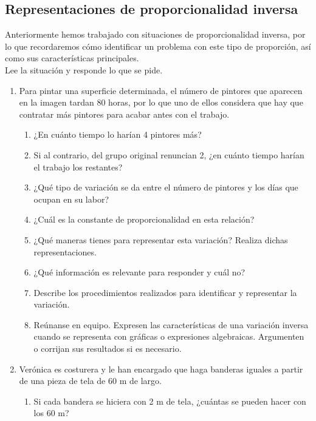 \documentclass[11pt]{book}
\begin{document}
\subsection{Representaciones de proporcionalidad inversa}
Anteriormente hemos trabajado con situaciones de proporcionalidad inversa, por lo que recordaremos cómo identificar
un problema con este tipo de proporción, así como sus características principales.\\

Lee la situación y responde lo que se pide.\\

\begin{enumerate}
  \item Para pintar una superficie determinada, el número de pintores que aparecen en la imagen tardan 80 horas,
        por lo que uno de ellos considera que hay que contratar más pintores para acabar antes con el trabajo.
        \begin{enumerate}
          \item ¿En cuánto tiempo lo harían 4 pintores más?
          \item Si al contrario, del grupo original renuncian 2, ¿en cuánto tiempo harían el trabajo los restantes?
          \item ¿Qué tipo de variación se da entre el número de pintores y los días que ocupan en su labor?
          \item ¿Cuál es la constante de proporcionalidad en esta relación?
          \item ¿Qué maneras tienes para representar esta variación? Realiza dichas representaciones.
          \item ¿Qué información es relevante para responder y cuál no?
          \item Describe los procedimientos realizados para identificar y representar la variación.
          \item Reúnanse en equipo. Expresen las características de una variación inversa cuando se representa con
                gráficas o expresiones algebraicas. Argumenten o corrijan sus resultados si es necesario.
        \end{enumerate}
  \item Verónica es costurera y le han encargado que haga banderas iguales a partir de una pieza de tela de 60 m de largo.
        \begin{enumerate}
          \item Si cada bandera se hiciera con 2 m de tela, ¿cuántas se pueden hacer con los 60 m?

\end{enumerate}
\end{enumerate}
\end{document}
